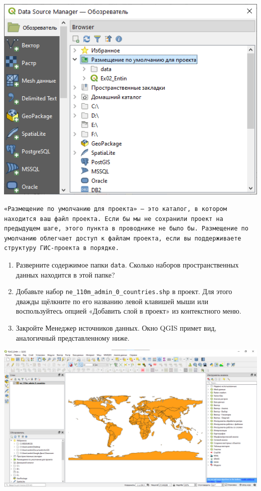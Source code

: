 \documentclass[
  12pt,
]{book}
\begin{document}
\includegraphics{images/Ex01_WorldMap/dataSourceManagerWindowDefault.png}

\begin{verbatim}
«Размещение по умолчанию для проекта» — это каталог, в котором находится ваш файл проекта. Если бы мы не сохранили проект на предыдущем шаге, этого пункта в проводнике не было бы. Размещение по умолчанию облегчает доступ к файлам проекта, если вы поддерживаете структуру ГИС-проекта в порядке.
\end{verbatim}

\begin{enumerate}
\def\labelenumi{\arabic{enumi}.}
\setcounter{enumi}{5}
\item
  Разверните содержимое папки \texttt{data}. Сколько наборов пространственных данных находится в этой папке?
\item
  Добавьте набор \texttt{ne\_110m\_admin\_0\_countries.shp} в проект. Для этого дважды щёлкните по его названию левой клавишей мыши или воспользуйтесь опцией «Добавить слой в проект» из контекстного меню.
\item
  Закройте Менеджер источников данных. Окно QGIS примет вид, аналогичный представленному ниже.
\end{enumerate}

\includegraphics{images/Ex01_WorldMap/Stage1.png}
\end{document}
